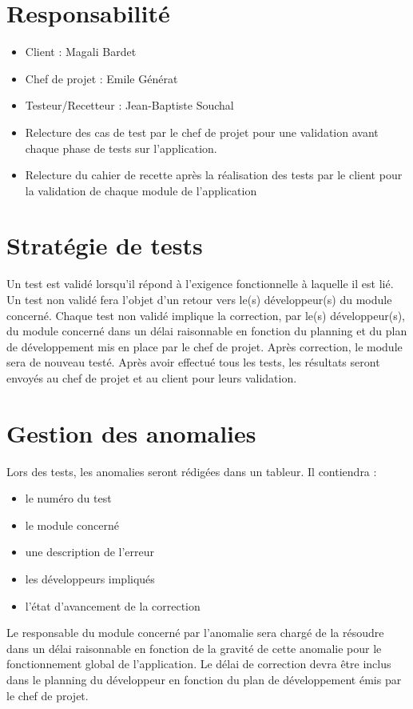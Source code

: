 \documentclass[a4paper,11pt,french]{article}
\begin{document}
\section{Responsabilité}

\begin{itemize}
  \item Client : Magali Bardet
  \item Chef de projet : Emile Générat
  \item Testeur/Recetteur : Jean-Baptiste Souchal
  \item Relecture des cas de test par le chef de projet pour une validation avant 
  chaque phase de tests sur l'application.
  \item Relecture du cahier de recette après la réalisation des tests par le 
  client pour la validation de chaque module de l'application
\end{itemize}

\section{Stratégie de tests}
Un test est validé lorsqu’il répond à l’exigence fonctionnelle à laquelle il est lié.
Un test non validé fera l’objet d’un retour vers le(s) développeur(s) du module concerné.
Chaque test non validé implique la correction, par le(s) développeur(s), du module concerné dans
un délai raisonnable en fonction du planning et du plan de développement mis en place par le chef de
projet. Après correction, le module sera de nouveau testé. Après avoir effectué tous les tests, les
résultats seront envoyés au chef de projet et au client pour leurs validation.

\section{Gestion des anomalies}
Lors des tests, les anomalies seront rédigées dans un tableur. Il contiendra :

\begin{itemize}
  \item le numéro du test
  \item le module concerné
  \item une description de l'erreur
  \item les développeurs impliqués
  \item l’état d’avancement de la correction
\end{itemize}

Le responsable du module concerné par l’anomalie sera chargé de la résoudre dans un
  délai raisonnable en fonction de la gravité de cette anomalie pour le fonctionnement global
  de l’application. Le délai de correction devra être inclus dans le planning du développeur en fonction
  du plan de développement émis par le chef de projet.
\newpage
\end{document}
